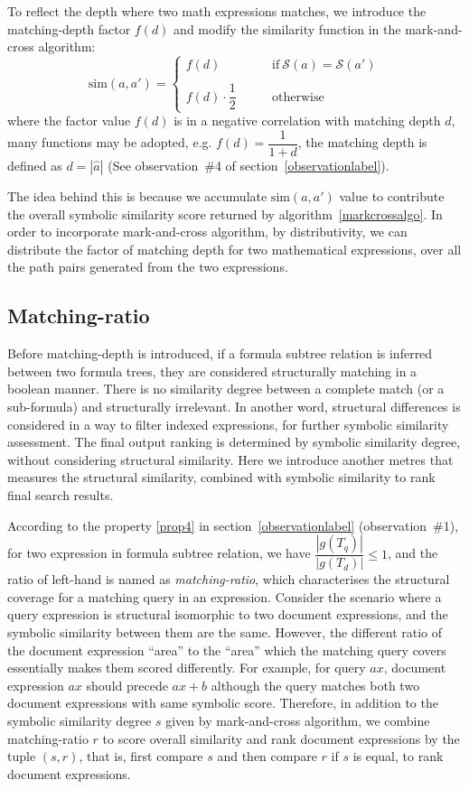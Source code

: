 To reflect the depth where two math expressions matches, we introduce the matching-depth factor $f(d)$ and modify the similarity function in the mark-and-cross algorithm:
$$
\mathrm{sim}(a,a') = 
\left\{
\begin{array}{ll}
f(d)   &\qquad \mathrm{if}\  \mathcal{S}(a) = \mathcal{S}(a')
\\
\\
f(d) \cdot \dfrac 1 2  &\qquad \mathrm{otherwise}
\end{array}
\right.
$$
where the factor value $f(d)$ is in a negative correlation with matching depth $d$, many functions may be adopted, e.g. $f(d) = \dfrac{1}{1 + d}$, 
the matching depth is defined as $d = |\hat{a}|$ (See observation~\#4 of section~\ref{observationlabel}).

The idea behind this is because we accumulate $\mathrm{sim}(a,a')$ value to contribute the overall symbolic similarity score returned by algorithm~\ref{markcrossalgo}. In order to incorporate mark-and-cross algorithm, by distributivity, we can distribute the factor of matching depth for two mathematical expressions, over all the path pairs generated from the two expressions. 

\subsection{Matching-ratio}
Before matching-depth is introduced, if a formula subtree relation is inferred between two formula trees, they are considered structurally matching in a boolean manner. 
There is no similarity degree between a complete match (or a sub-formula) and structurally irrelevant. 
In another word, structural differences is considered in a way to filter indexed expressions, for further symbolic similarity assessment. 
The final output ranking is determined by symbolic similarity degree, without considering structural similarity. 
Here we introduce another metres that measures the structural similarity, combined with symbolic similarity to rank final search results.

According to the property \ref{prop4} in section~\ref{observationlabel} (observation~\#1), for two expression in formula subtree relation, we have $\dfrac{|g(T_q)|}{|g(T_d)|} \le 1$, and the ratio of left-hand is named as \textit{matching-ratio}, which characterises the structural coverage for a matching query in an expression.
Consider the scenario where a query expression is structural isomorphic to two document expressions, and the symbolic similarity between them are the same. 
However, the different ratio of the document expression ``area'' to the ``area'' which the matching query covers essentially makes them scored differently.
For example, for query $ax$, document expression $ax$ should precede $ax+b$ although the query matches both two document expressions with same symbolic score.
Therefore, in addition to the symbolic similarity degree $s$ given by mark-and-cross algorithm, we combine matching-ratio $r$ to score overall similarity and rank document expressions by the tuple $(s, r)$, that is, first compare $s$ and then compare $r$ if $s$ is equal, to rank document expressions.
